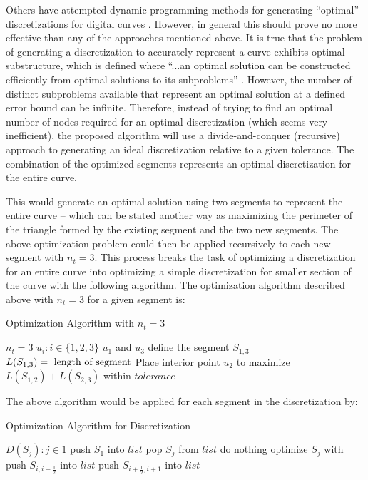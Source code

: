 Others have attempted dynamic programming methods for generating 
``optimal'' discretizations for digital curves \cite{horng02}. However, in 
general this should prove no more effective than any of the approaches 
mentioned above. It is true that the problem of generating a discretization to accurately represent a curve exhibits optimal substructure, which is defined where ``...an optimal solution can be constructed efficiently from optimal solutions to its subproblems'' \cite{cormen01}. However, the number of distinct subproblems available that represent an optimal solution at a defined error bound can be infinite. Therefore, instead of trying to find an optimal number of nodes required for an optimal discretization (which seems very inefficient), the proposed algorithm will use a divide-and-conquer (recursive) approach to generating an ideal discretization relative to a given tolerance. The combination of the optimized segments represents an optimal discretization for the entire curve.

This would generate an optimal solution using two segments to represent the entire curve -- which can be stated another way as maximizing the perimeter of the triangle formed by the existing segment and the two new segments. The above optimization problem could then be applied recursively to each new segment with $n_t=3$. This process breaks the task of optimizing a discretization for an entire curve into optimizing a simple discretization for smaller section of the curve with the following algorithm. The optimization algorithm described above with $n_t=3$ for a given segment is:

\begin{algorithm}
\caption{Optimization Algorithm with $n_t=3$}\label{alg:localoptimize}
\begin{algorithmic}[1]
\State $n_t = 3$
\State $u_i : i \in \{1,2,3\}$
\State $u_1 $ and $u_3$ define the segment $S_{1,3}$
  \State $L(S_{1,3}) =\textnormal{ length of segment}$
  \State Place interior point $u_2$ to maximize $L(S_{1,2})+L(S_{2,3})$ within $tolerance$
\EndProcedure
\end{algorithmic}
\end{algorithm}

The above algorithm would be applied for each segment in the 
discretization by:
  
\begin{algorithm}[H]
\caption{Optimization Algorithm for Discretization}\label{alg:discreteoptimize}
\begin{algorithmic}
  \State $D(S_j) : j \in {1}$
  \State push $S_1$ into $list$ 
    \State pop $S_j$ from $list$
      \State do nothing
    \Else
      \State optimize $S_j$ with 
      \State push $S_{i,i+\frac{1}{2}}$ into $list$
      \State push $S_{i+\frac{1}{2},i+1}$ into $list$
    \EndIf
  \EndWhile
\end{algorithmic}
\end{algorithm}

